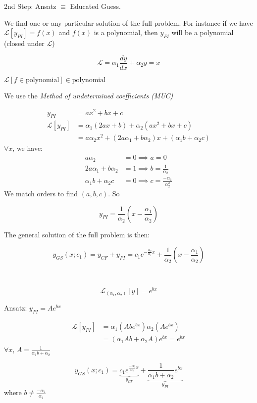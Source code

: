 \documentclass[10pt]{scrartcl}
\begin{document}
2nd Step: 
Ansatz $\equiv$ Educated Guess.

 We find one or any particular solution of the full problem. For instance if we have $\mathcal{L}[y_{PI}] = f(x)$ and $f(x)$ is a polynomial, then $y_{PI}$ will be a polynomial (closed under $\mathcal{L}$)\\

\begin{example}
\[\mathcal{L} = \alpha_1\frac{dy}{dx} + \alpha_2y = x\]	

$\mathcal{L}[f \in \mbox{polynomial}] \in \mbox{polynomial}$

We use the \emph{Method of undetermined coefficients (MUC)}

\[
\begin{aligned}
  y_{PI} &= ax^2 + bx + c\\
  \mathcal{L}[y_{PI}] &= \alpha_1(2ax + b) + \alpha_2(ax^2 + bx + c)\\
  &= a\alpha_2x^2 + (2a\alpha_1 + b\alpha_2)x + (\alpha_1b + \alpha_2c)
\end{aligned}
\]
$\forall x$, we have: 
\[
\begin{aligned}
  a\alpha_2 & = 0 \implies a = 0\\
  2a\alpha_1 + b\alpha_2 &= 1\implies b = \frac{1}{\alpha_2}\\
  \alpha_1b + \alpha_2c &= 0 \implies c = \frac{-\alpha_1}{\alpha_2^2}
\end{aligned}
\]
We match orders to find $(a,b,c)$. So 

\[y_{PI} = \frac{1}{\alpha_2}\left(x-\frac{\alpha_1}{\alpha_2}\right)\]

The general solution of the full problem is then: 

\[y_{GS}(x;c_1) = y_{CF} + y_{PI} = c_1e^{-\frac{\alpha_2}{\alpha_1}x} + \frac{1}{\alpha_2}\left(x-\frac{\alpha_1}{\alpha_2}\right)\]
\end{example}~\vspace*{5pt}

\begin{example}
\[\mathcal{L}_{(\alpha_1,\alpha_2)}[y] = e^{bx}\]

Ansatz: $y_{PI} = Ae^{bx}$	

\[
\begin{aligned}
  \mathcal{L}[y_{PI}] &= \alpha_1(Abe^{bx}) \alpha_2(Ae^{bx})\\
  &= (\alpha_1Ab + \alpha_2A)e^{bx} = e^{bx}
\end{aligned}
\]
$\forall x$, $A = \frac{1}{\alpha_1b + \alpha_2}$

\[
  y_{GS}(x;c_1) = \underbrace{c_1e^{\frac{-\alpha_2}{\alpha_1}x}}_{y_{CF}} + \underbrace{\frac{1}{\alpha_1b+\alpha_2}e^{bx}}_{y_{PI}}
\]
where $b \neq \frac{-\alpha_2}{\alpha_1}$
\end{example}~\vspace*{5pt}
\end{document}
